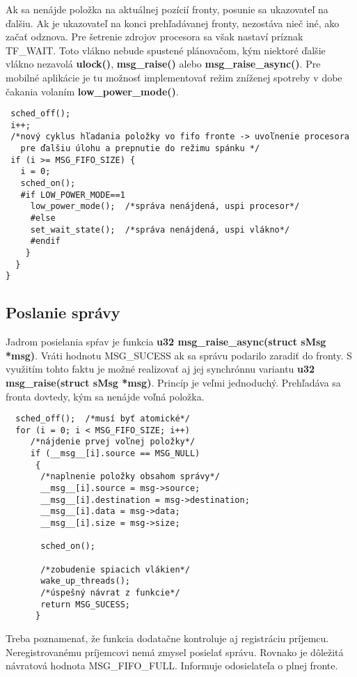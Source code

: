 Ak sa nenájde položka na aktuálnej pozícií fronty, posunie sa ukazovateľ na ďalšiu. Ak je ukazovateľ na konci prehľadávanej fronty, nezostáva nieč iné, ako začať odznova. Pre šetrenie zdrojov procesora sa však nastaví príznak TF\_WAIT. Toto vlákno nebude spustené plánovačom, kým niektoré ďalšie vlákno nezavolá \textbf{ulock()}, \textbf{msg\_raise()} alebo \textbf{msg\_raise\_async()}. Pre mobilné aplikácie je tu možnosť implementovať režim zníženej spotreby v dobe čakania volaním \textbf{low\_power\_mode()}.
{\small
\begin{verbatim}
 sched_off();
 i++;
 /*nový cyklus hľadania položky vo fifo fronte -> uvoľnenie procesora 
   pre ďalšiu úlohu a prepnutie do režimu spánku */
 if (i >= MSG_FIFO_SIZE) {
   i = 0;
   sched_on();	
   #if LOW_POWER_MODE==1
     low_power_mode();	/*správa nenájdená, uspi procesor*/
     #else
     set_wait_state();	/*správa nenájdená, uspi vlákno*/
     #endif
    }  
  }
}
\end{verbatim}
}

\subsection {Poslanie správy}

Jadrom posielania spŕav je funkcia \textbf{u32 msg\_raise\_async(struct sMsg *msg)}. Vráti hodnotu MSG\_SUCESS ak sa správu podarilo zaradiť do fronty. S využitím tohto faktu je možné realizovať aj jej synchrónnu variantu \textbf{u32 msg\_raise(struct sMsg *msg)}. Princíp je veľmi jednoduchý. Prehľadáva sa fronta dovtedy, kým sa nenájde voľná položka.
{\small
\begin{verbatim}
  sched_off();  /*musí byť atomické*/
  for (i = 0; i < MSG_FIFO_SIZE; i++)
     /*nájdenie prvej voľnej položky*/
     if (__msg__[i].source == MSG_NULL) 
      {
       /*naplnenie položky obsahom správy*/
       __msg__[i].source = msg->source;
       __msg__[i].destination = msg->destination;
       __msg__[i].data = msg->data;
       __msg__[i].size = msg->size;

       sched_on();

       /*zobudenie spiacich vlákien*/
       wake_up_threads();
       /*úspešný návrat z funkcie*/
       return MSG_SUCESS;	
      }
\end{verbatim}
}

Treba poznamenať, že funkcia dodatačne kontroluje aj registráciu príjemcu. Neregistrovanému príjemcovi nemá zmysel posielať správu. Rovnako je dôležitá návratová hodnota MSG\_FIFO\_FULL. Informuje odosielateľa o plnej fronte.


